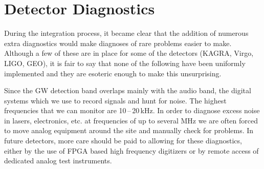 %


\section{Detector Diagnostics}
\label{s:IDC:diagnostics}
During the integration process, it became clear that the addition of numerous
extra diagnostics would make diagnoses of rare problems easier to make. Although
a few of these are in place for some of the detectors (KAGRA, Virgo, LIGO, GEO),
it is fair to say that none of the following have been uniformly implemented and
they are esoteric enough to make this unsurprising.

Since the GW detection band overlaps mainly with the audio band, the
    digital systems which we use to record signals and hunt for noise. The highest
    frequencies that we can monitor are 10\,--\,20\,kHz. In order to diagnose
    excess noise in lasers, electronics, etc. at frequencies of up to several
    MHz we are often forced to move analog equipment around the site and manually
    check for problems. In future detectors, more care should be paid to allowing
    for these diagnostics, either by the use of FPGA based high frequency
    digitizers or by remote access of dedicated analog test instruments.

